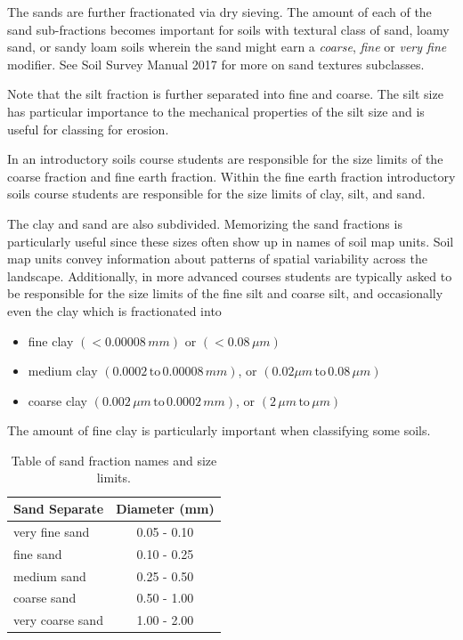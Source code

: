 \documentclass[a5paper]{book}
\begin{document}
The sands are further fractionated via dry sieving. The amount of each of the sand sub-fractions becomes important for soils with textural class of sand, loamy sand, or sandy loam soils wherein the sand might earn a \emph{coarse}, \emph{fine} or \emph{very fine} modifier. See Soil Survey Manual 2017 for more on sand textures subclasses.

Note that the silt fraction is further separated into fine and coarse. The silt size has particular importance to the mechanical properties of the silt size and is useful for classing for erosion.

In an introductory soils course students are responsible for the size limits of the coarse fraction and fine earth fraction. Within the fine earth fraction introductory soils course students are responsible for the size limits of clay, silt, and sand.

The clay and sand are also subdivided. Memorizing the sand fractions is particularly useful since these sizes often show up in names of soil map units. Soil map units convey information about patterns of spatial variability across the landscape. Additionally, in more advanced courses students are typically asked to be responsible for the size limits of the fine silt and coarse silt, and occasionally even the clay which is fractionated into
    
\begin{itemize}
    \item fine clay $\left( < 0.00008\, mm \right)$ or $\left( < 0.08\, \mu m \right)$
    \item medium clay $\left(0.0002\, \text{to}\, 0.00008\, mm \right)$, or $\left(0.02 \mu m\,\text{to}\,0.08\, \mu m \right)$
    \item coarse clay $\left(0.002\, \mu m\, \text{to}\, 0.0002\, mm\right)$, or $\left(2\, \mu m\,\text{to}\,\mu m \right)$
\end{itemize}
    
The amount of fine clay is particularly important when classifying some soils.
    
\begin{table}[!htbp]
\label{tab:sandfractions}
\centering
\caption{Table of sand fraction names and size limits.}
\begin{tabular}{|l|c|}
\hline
Sand Separate           &  Diameter (mm)\\
\hline \hline
very fine sand          & 0.05 - 0.10\\
fine sand               & 0.10 - 0.25\\
medium sand             & 0.25 - 0.50\\
coarse sand             & 0.50 - 1.00\\
very coarse sand        & 1.00 - 2.00\\
\hline
\end{tabular}
\end{table}
    
\end{document}
